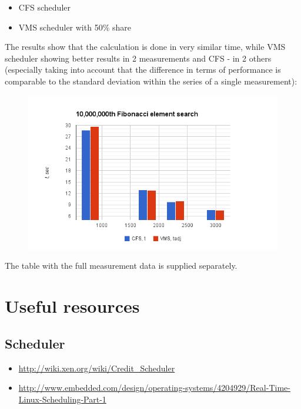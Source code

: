 \documentclass[]{report}
\begin{document}
\begin{itemize}
\itemsep1pt\parskip0pt
\item
  CFS scheduler
\item
  VMS scheduler with 50\% share
\end{itemize}

The results show that the calculation is done in very similar time,
while VMS scheduler showing better results in 2 measurements and CFS -
in 2 others (especially taking into account that the difference in terms
of performance is comparable to the standard deviation within the series
of a single measurement):

\begin{figure}[htbp]
\centering
\includegraphics{img/sched_measurement.png}
\end{figure}

The table with the full measurement data is supplied separately.

\section{Useful resources}\label{useful-resources}

\subsection{Scheduler}\label{scheduler-1}

\begin{itemize}
\itemsep1pt\parskip0pt
\item
  \url{http://wiki.xen.org/wiki/Credit_Scheduler}
\item
  \url{http://www.embedded.com/design/operating-systems/4204929/Real-Time-Linux-Scheduling-Part-1}
\end{itemize}
\end{document}
